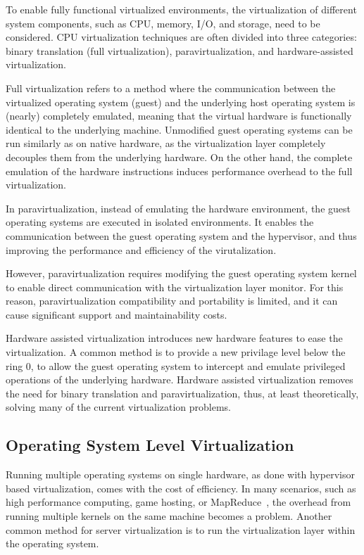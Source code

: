 To enable fully functional virtualized environments, the virtualization of different system components, such as CPU, memory, I/O, and storage, need to be considered. CPU virtualization techniques are often divided into three categories: binary translation (full virtualization), paravirtualization, and hardware-assisted virtualization.~\cite{Bugnion:2012:BVX, Pearce:2013:VIS, Horne:2007:Understanding}

Full virtualization refers to a method where the communication between the virtualized operating system (guest) and the underlying host operating system is (nearly) completely emulated, meaning that the virtual hardware is functionally identical to the underlying machine. Unmodified guest operating systems can be run similarly as on native hardware, as the virtualization layer completely decouples them from the underlying hardware. On the other hand, the complete emulation of the hardware instructions induces performance overhead to the full virtualization.~\cite{Bugnion:2012:BVX, Barham:2003:XAV, Horne:2007:Understanding}

In paravirtualization, instead of emulating the hardware environment, the guest operating systems are executed in isolated environments. It enables the communication between the guest operating system and the hypervisor, and thus improving the performance and efficiency of the virutalization.~\cite{Barham:2003:XAV, Horne:2007:Understanding}

However, paravirtualization requires modifying the guest operating system kernel to enable direct communication with the virtualization layer monitor. For this reason, paravirtualization compatibility and portability is limited, and it can cause significant support and maintainability costs.~\cite{Barham:2003:XAV, Horne:2007:Understanding}

Hardware assisted virtualization introduces new hardware features to ease the virtualization. A common method is to provide a new privilage level below the ring 0, to allow the guest operating system to intercept and emulate privileged operations of the underlying hardware. Hardware assisted virtualization removes the need for binary translation and paravirtualization, thus, at least theoretically, solving many of the current virtualization problems.~\cite{Horne:2007:Understanding, Pearce:2013:VIS}

\subsection{Operating System Level Virtualization}
Running multiple operating systems on single hardware, as done with hypervisor based virtualization, comes with the cost of efficiency. In many scenarios, such as high performance computing, game hosting, or MapReduce~\cite{Dean:2008:MR}, the overhead from running multiple kernels on the same machine becomes a problem. Another common method for server virtualization is to run the virtualization layer within the operating system.~\cite{Soltesz:2007:COS, Xavier:2014:Containers}

